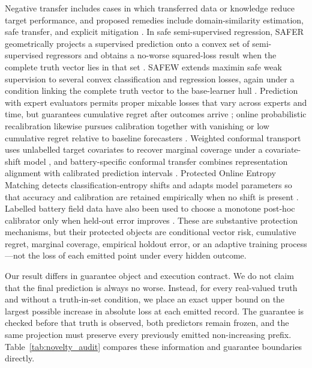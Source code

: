 \documentclass[11pt]{article}
\begin{document}
Negative transfer includes cases in which transferred data or knowledge reduce target performance, and proposed remedies include domain-similarity estimation, safe transfer, and explicit mitigation \citep{zhang2023negative}. In safe semi-supervised regression, SAFER geometrically projects a supervised prediction onto a convex set of semi-supervised regressors and obtains a no-worse squared-loss result when the complete truth vector lies in that set \citep{li2017safer}. SAFEW extends maximin safe weak supervision to several convex classification and regression losses, again under a condition linking the complete truth vector to the base-learner hull \citep{li2021safeweak}. Prediction with expert evaluators permits proper mixable losses that vary across experts and time, but guarantees cumulative regret after outcomes arrive \citep{chernov2009evaluators}; online probabilistic recalibration likewise pursues calibration together with vanishing or low cumulative regret relative to baseline forecasters \citep{marx2025calibrated,deshpande2025calibrated}. Weighted conformal transport uses unlabelled target covariates to recover marginal coverage under a covariate-shift model \citep{tuwani2023transport}, and battery-specific conformal transfer combines representation alignment with calibrated prediction intervals \citep{filgueira2026conformalized}. Protected Online Entropy Matching detects classification-entropy shifts and adapts model parameters so that accuracy and calibration are retained empirically when no shift is present \citep{bar2024protected}. Labelled battery field data have also been used to choose a monotone post-hoc calibrator only when held-out error improves \citep{nyachionjeka2026safecalibrated}. These are substantive protection mechanisms, but their protected objects are conditional vector risk, cumulative regret, marginal coverage, empirical holdout error, or an adaptive training process---not the loss of each emitted point under every hidden outcome.

Our result differs in guarantee object and execution contract. We do not claim that the final prediction is always no worse. Instead, for every real-valued truth and without a truth-in-set condition, we place an exact upper bound on the largest possible increase in absolute loss at each emitted record. The guarantee is checked before that truth is observed, both predictors remain frozen, and the same projection must preserve every previously emitted non-increasing prefix. Table~\ref{tab:novelty_audit} compares these information and guarantee boundaries directly.
\end{document}
